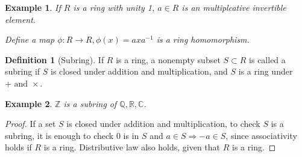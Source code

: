 \documentclass{article}
\theoremstyle{MyNonumberplain}
\theoremstyle{break}
\newtheorem*{proof}{Proof. }
\newcommand{\infixand}{\text{ and }}
\theoremstyle{break}
\newtheorem{example}{Example}[section]
\theoremstyle{break}
\theoremstyle{definition}
\theoremstyle{break}
\newtheorem{definition}{Definition}[section]
\begin{document}
\begin{expbox}
    \begin{example}
        If $R$ is a ring with unity 1, $a \in R$ is an multiplcative invertible
        element.\bigskip
        
        Define a map $\phi : R \rightarrow R, \phi (x) = a x a^{- 1}$ is a ring
        homomorphism.
    \end{example}
\end{expbox}
\begin{defbox}
    \begin{definition}[Subring]
        If $R$ is a ring, a nonempty subset $S \subset R$ is called a subring if $S$
        is closed under addition and multiplication, and $S$ is a ring under $+
        \infixand \times$.
    \end{definition}
\end{defbox}

\begin{expbox}
    \begin{example}
        $\mathbb{Z}$ is a subring of $\mathbb{Q}, \mathbb{R}, \mathbb{C}$.
    \end{example}
    \begin{prfbox}
        \begin{proof}
            If a set $S$ is closed under addition and multiplication, to check $S$ is a
            subring, it is enough to check $0$ is in $S$ and $a \in S \Rightarrow - a \in S$, since associativity holds if $R$ is a ring. Distributive law also holds, given that $R$ is a ring.

        \end{proof}
    \end{prfbox}
\end{expbox}
\end{document}
